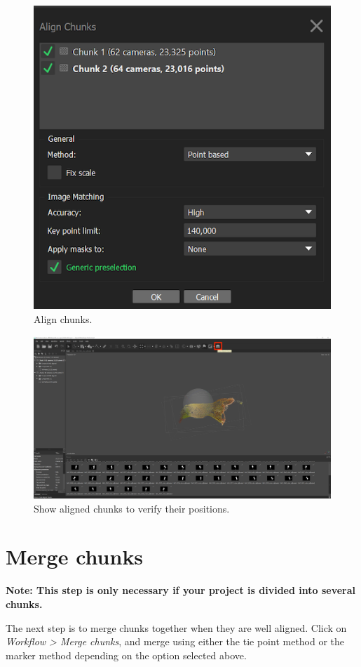 \documentclass[
]{book}
\begin{document}
\begin{figure}

{\centering \includegraphics[width=0.5\linewidth]{Figures/metashape_align_chunks} 

}

\caption{Align chunks.}\label{fig:alignchunks}
\end{figure}
\begin{figure}

{\centering \includegraphics[width=1\linewidth]{Figures/metashape_show_aligned_chunks} 

}

\caption{Show aligned chunks to verify their positions.}\label{fig:showalignedchunks}
\end{figure}

\hypertarget{merge-chunks}{%
\section{Merge chunks}\label{merge-chunks}}

{\textbf{Note: This step is only necessary if your project is divided into several chunks.}}

The next step is to merge chunks together when they are well aligned.
Click on \emph{Workflow \textgreater{} Merge chunks}, and merge using either the tie
point method or the marker method depending on the option selected
above.
\end{document}
